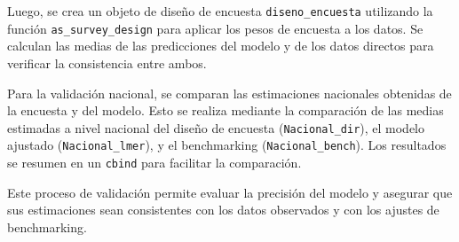 \documentclass[
  12pt,
]{book}
\begin{document}
Luego, se crea un objeto de diseño de encuesta \texttt{diseno\_encuesta} utilizando la función \texttt{as\_survey\_design} para aplicar los pesos de encuesta a los datos. Se calculan las medias de las predicciones del modelo y de los datos directos para verificar la consistencia entre ambos.

Para la validación nacional, se comparan las estimaciones nacionales obtenidas de la encuesta y del modelo. Esto se realiza mediante la comparación de las medias estimadas a nivel nacional del diseño de encuesta (\texttt{Nacional\_dir}), el modelo ajustado (\texttt{Nacional\_lmer}), y el benchmarking (\texttt{Nacional\_bench}). Los resultados se resumen en un \texttt{cbind} para facilitar la comparación.

Este proceso de validación permite evaluar la precisión del modelo y asegurar que sus estimaciones sean consistentes con los datos observados y con los ajustes de benchmarking.
\end{document}
